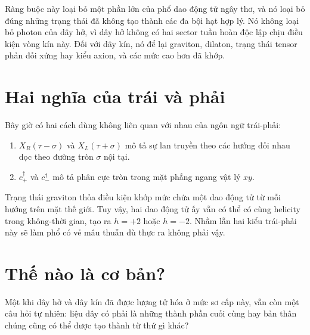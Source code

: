 Ràng buộc này loại bỏ một phần lớn của phổ dao động tử ngây thơ, và nó loại bỏ đúng những trạng thái đã không tạo thành các đa bội hạt hợp lý. Nó không loại bỏ photon của dây hở, vì dây hở không có hai sector tuần hoàn độc lập chịu điều kiện vòng kín này. Đối với dây kín, nó để lại graviton, dilaton, trạng thái tensor phản đối xứng hay kiểu axion, và các mức cao hơn đã khớp.

\section{Hai nghĩa của trái và phải}

Bây giờ có hai cách dùng không liên quan với nhau của ngôn ngữ trái-phải:
\begin{enumerate}
  \item \(X_R(\tau-\sigma)\) và \(X_L(\tau+\sigma)\) mô tả sự lan truyền theo các hướng đối nhau dọc theo đường tròn \(\sigma\) nội tại.
  \item \(c_+^\dagger\) và \(c_-^\dagger\) mô tả phân cực tròn trong mặt phẳng ngang vật lý \(xy\).
\end{enumerate}
Trạng thái graviton thỏa điều kiện khớp mức chứa một dao động tử từ mỗi hướng trên mặt thế giới. Tuy vậy, hai dao động tử ấy vẫn có thể có cùng helicity trong không-thời gian, tạo ra \(h=+2\) hoặc \(h=-2\). Nhầm lẫn hai kiểu trái-phải này sẽ làm phổ có vẻ mâu thuẫn dù thực ra không phải vậy.

\section{Thế nào là cơ bản?}

Một khi dây hở và dây kín đã được lượng tử hóa ở mức sơ cấp này, vẫn còn một câu hỏi tự nhiên: liệu dây có phải là những thành phần cuối cùng hay bản thân chúng cũng có thể được tạo thành từ thứ gì khác?

\begin{classroomqa}
\end{classroomqa}

